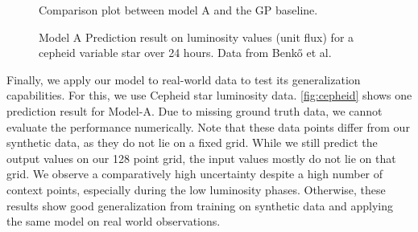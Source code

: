 \begin{figure}
	\centering
	\resizebox{0.5\textwidth}{!}{
		
	}
	\caption{Comparison plot between model A and the GP baseline.}
	\label{fig:gp_comp}
\end{figure}

\begin{figure}
	\centering
	\resizebox{0.4\textwidth}{!}{
		
	}
	\caption{Model A Prediction result on luminosity values (unit flux) for a cepheid variable star over 24 hours. Data from Benkő et al. \cite{Benk__2014}}
	\label{fig:cepheid}
\end{figure}

Finally, we apply our model to real-world data to test its generalization capabilities. For this, we use Cepheid star luminosity data. \autoref{fig:cepheid} shows one prediction result for Model-A. Due to missing ground truth data, we cannot evaluate the performance numerically. Note that these data points differ from our synthetic data, as they do not lie on a fixed grid. While we still predict the output values on our 128 point grid, the input values mostly do not lie on that grid. We observe a comparatively high uncertainty despite a high number of context points, especially during the low luminosity phases. Otherwise, these results show good generalization from training on synthetic data and applying the same model on real world observations.

